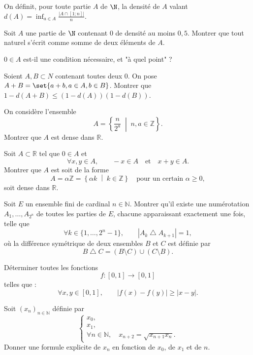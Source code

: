 \documentclass[11pt,a4paper]{article}
\begin{document}
\begin{exercise}
On définit, pour toute partie $A$ de $\N$, la densité de $A$ valant $d(A)=\inf_{a\in A}{\frac{|A\cap [1;n]|}{n}}$.
\begin{questions}
\item Soit $A$ une partie de $\N$ contenant $0$ de densité au moins $0,5$. Montrer que tout naturel s'écrit comme somme de deux éléments de $A$.
\item $0\in A$ est-il une condition nécessaire, et "à quel point" ?
\item Soient $A,B \subset N$ contenant toutes deux $0$. On pose $A+B=\set{a+b, a\in A, b\in B}$. Montrer que $1-d(A+B)\le (1-d(A))(1-d(B))$.
\end{questions}
\end{exercise}

\begin{exercise}
On considère l'ensemble
\[
A=\left\{\frac{n}{2^a}\;\middle|\; n,a\in\mathbb{Z}\right\}.
\]
Montrer que $A$ est dense dans $\mathbb{R}$.
\end{exercise}

\begin{exercise}
Soit $A\subset\mathbb{R}$ tel que $0\in A$ et
\[
\forall x,y\in A,\qquad -x\in A
\quad\text{et}\quad x+y\in A.
\]
Montrer que $A$ est soit de la forme
\[
A=\alpha\mathbb{Z}
=\left\{\alpha k\;\middle|\; k\in\mathbb{Z}\right\}
\quad\text{pour un certain }\alpha\geq 0,
\]
soit dense dans $\mathbb{R}$.
\end{exercise}

\begin{exercise}
Soit $E$ un ensemble fini de cardinal $n\in\mathbb{N}$.
Montrer qu'il existe une numérotation
$A_1,\ldots,A_{2^n}$ de toutes les parties de $E$,
chacune apparaissant exactement une fois, telle que
\[
\forall k\in\{1,\ldots,2^n-1\},\qquad
\left|A_k\mathbin{\triangle}A_{k+1}\right|=1,
\]
où la différence symétrique de deux ensembles $B$ et $C$
est définie par
\[
B\mathbin{\triangle}C=(B\setminus C)\cup(C\setminus B).
\]
\end{exercise}

\begin{exercise}
Déterminer toutes les fonctions
\[
f : [0,1] \longrightarrow [0,1]
\]
telles que :
\[
\forall x,y\in[0,1],\qquad
\left|f(x)-f(y)\right|\geq\left|x-y\right|.
\]
\end{exercise}

\begin{exercise}
Soit $(x_n)_{n\in\mathbb{N}}$ définie par
\[
\begin{cases}
x_0,\\
x_1,\\
\forall n\in\mathbb{N},\quad x_{n+2}=\sqrt{x_{n+1}x_n}.
\end{cases}
\]
Donner une formule explicite de $x_n$ en fonction de $x_0$, de $x_1$ et de $n$.
\end{exercise}
\end{document}
